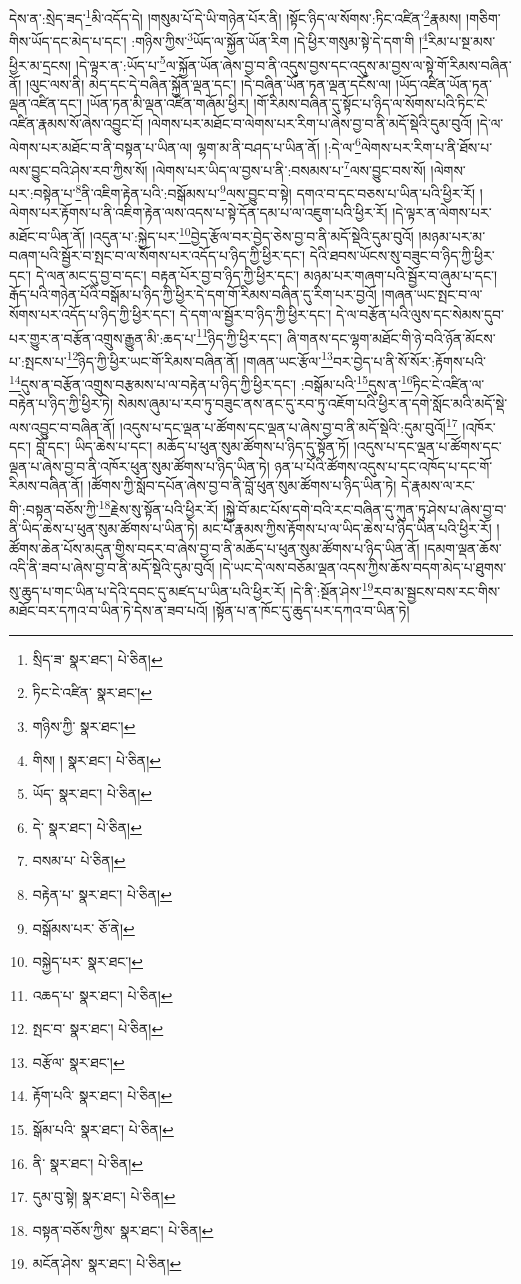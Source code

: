 དེས་ན་:སྲེད་ཟད་\footnote{སྲིད་ཟ་  སྣར་ཐང་།  པེ་ཅིན། }མི་འདོད་དེ། །གསུམ་པོ་དེ་ཡི་གཉེན་པོར་ནི། །སྟོང་ཉིད་ལ་སོགས་:ཏིང་འཛིན་\footnote{ཏིང་ངེ་འཛིན་  སྣར་ཐང་། }རྣམས། །གཅིག་གིས་ཡོད་དང་མེད་པ་དང་། :གཉིས་ཀྱིས་\footnote{གཉིས་ཀྱི་  སྣར་ཐང་། }ཡོད་ལ་སྐྱོན་ཡོན་རིག །དེ་ཕྱིར་གསུམ་སྟེ་དེ་དག་གི །\footnote{གིས། །  སྣར་ཐང་།  པེ་ཅིན། }རིམ་པ་སྔ་མས་ཕྱིར་མ་དྲངས། །དེ་ལྟར་ན་:ཡོད་པ་\footnote{ཡོད་  སྣར་ཐང་།  པེ་ཅིན། }ལ་སྐྱོན་ཡོན་ཞེས་བྱ་བ་ནི་འདུས་བྱས་དང་འདུས་མ་བྱས་ལ་སྟེ་གོ་རིམས་བཞིན་ནོ། །ལུང་ལས་ནི། མེད་དང་དེ་བཞིན་སྐྱོན་ལྡན་དང་། །དེ་བཞིན་ཡོན་ཏན་ལྡན་དངོས་ལ། །ཡོད་འཛིན་ཡོན་ཏན་ལྡན་འཛིན་དང་། །ཡོན་ཏན་མི་ལྡན་འཛིན་གཞོམ་ཕྱིར། །གོ་རིམས་བཞིན་དུ་སྟོང་པ་ཉིད་ལ་སོགས་པའི་ཏིང་ངེ་འཛིན་རྣམས་སོ་ཞེས་འབྱུང་ངོ། །ལེགས་པར་མཐོང་བ་ལེགས་པར་རིག་པ་ཞེས་བྱ་བ་ནི་མདོ་སྡེའི་དུམ་བུའོ། །དེ་ལ་ལེགས་པར་མཐོང་བ་ནི་བསྟན་པ་ཡིན་ལ། ལྷག་མ་ནི་བཤད་པ་ཡིན་ནོ། །:དེ་ལ་\footnote{དེ་  སྣར་ཐང་།  པེ་ཅིན། }ལེགས་པར་རིག་པ་ནི་ཐོས་པ་ལས་བྱུང་བའི་ཤེས་རབ་ཀྱིས་སོ། །ལེགས་པར་ཡིད་ལ་བྱས་པ་ནི་:བསམས་པ་\footnote{བསམ་པ་  པེ་ཅིན། }ལས་བྱུང་བས་སོ། །ལེགས་པར་:བསྟེན་པ་\footnote{བརྟེན་པ་  སྣར་ཐང་།  པེ་ཅིན། }ནི་འཇིག་རྟེན་པའི་:བསྒོམས་པ་\footnote{བསྒོམས་པར་  ཅོ་ནེ། }ལས་བྱུང་བ་སྟེ། དགའ་བ་དང་བཅས་པ་ཡིན་པའི་ཕྱིར་རོ། །ལེགས་པར་རྟོགས་པ་ནི་འཇིག་རྟེན་ལས་འདས་པ་སྟེ་དོན་དམ་པ་ལ་འཇུག་པའི་ཕྱིར་རོ། །དེ་ལྟར་ན་ལེགས་པར་མཐོང་བ་ཡིན་ནོ། །འདུན་པ་:སྐྱེད་པར་\footnote{བསྐྱེད་པར་  སྣར་ཐང་། }བྱེད་རྩོལ་བར་བྱེད་ཅེས་བྱ་བ་ནི་མདོ་སྡེའི་དུམ་བུའོ། །མཉམ་པར་མ་བཞག་པའི་སྦྱོར་བ་སྤང་བ་ལ་སོགས་པར་འདོད་པ་ཉིད་ཀྱི་ཕྱིར་དང་། དེའི་ཐབས་ཡོངས་སུ་བཟུང་བ་ཉིད་ཀྱི་ཕྱིར་དང་། དེ་ལན་མང་དུ་བྱ་བ་དང་། བརྟན་པོར་བྱ་བ་ཉིད་ཀྱི་ཕྱིར་དང་། མཉམ་པར་གཞག་པའི་སྦྱོར་བ་ཞུམ་པ་དང་། རྒོད་པའི་གཉེན་པོའི་བསྒོམ་པ་ཉིད་ཀྱི་ཕྱིར་དེ་དག་གོ་རིམས་བཞིན་དུ་རིག་པར་བྱའོ། །གཞན་ཡང་སྤང་བ་ལ་སོགས་པར་འདོད་པ་ཉིད་ཀྱི་ཕྱིར་དང་། དེ་དག་ལ་སྦྱོར་བ་ཉིད་ཀྱི་ཕྱིར་དང་། དེ་ལ་བརྩོན་པའི་ལུས་དང་སེམས་དུབ་པར་གྱུར་ན་བརྩོན་འགྲུས་རྒྱུན་མི་:ཆད་པ་\footnote{འཆད་པ་  སྣར་ཐང་།  པེ་ཅིན། }ཉིད་ཀྱི་ཕྱིར་དང་། ཞི་གནས་དང་ལྷག་མཐོང་གི་ཉེ་བའི་ཉོན་མོངས་པ་:སྤངས་པ་\footnote{སྤང་བ་  སྣར་ཐང་།  པེ་ཅིན། }ཉིད་ཀྱི་ཕྱིར་ཡང་གོ་རིམས་བཞིན་ནོ། །གཞན་ཡང་རྩོལ་\footnote{བརྩོལ་  སྣར་ཐང་། }བར་བྱེད་པ་ནི་སོ་སོར་:རྟོགས་པའི་\footnote{རྟོག་པའི་  སྣར་ཐང་།  པེ་ཅིན། }དུས་ན་བརྩོན་འགྲུས་བརྩམས་པ་ལ་བརྟེན་པ་ཉིད་ཀྱི་ཕྱིར་དང་། :བསྒོམ་པའི་\footnote{སྒོམ་པའི་  སྣར་ཐང་།  པེ་ཅིན། }དུས་ན་\footnote{ནི་  སྣར་ཐང་།  པེ་ཅིན། }ཏིང་ངེ་འཛིན་ལ་བརྟེན་པ་ཉིད་ཀྱི་ཕྱིར་ཏེ། སེམས་ཞུམ་པ་རབ་ཏུ་བཟུང་ནས་ནང་དུ་རབ་ཏུ་འཇོག་པའི་ཕྱིར་ན་དགེ་སློང་མའི་མདོ་སྡེ་ལས་འབྱུང་བ་བཞིན་ནོ། །འདུས་པ་དང་ལྡན་པ་ཚོགས་དང་ལྡན་པ་ཞེས་བྱ་བ་ནི་མདོ་སྡེའི་:དུམ་བུའོ།\footnote{དུམ་བུ་སྟེ།  སྣར་ཐང་།  པེ་ཅིན། } །འཁོར་དང་། བློ་དང་། ཡིད་ཆེས་པ་དང་། མཆོད་པ་ཕུན་སུམ་ཚོགས་པ་ཉིད་དུ་སྟོན་ཏོ། །འདུས་པ་དང་ལྡན་པ་ཚོགས་དང་ལྡན་པ་ཞེས་བྱ་བ་ནི་འཁོར་ཕུན་སུམ་ཚོགས་པ་ཉིད་ཡིན་ཏེ། ཉན་པ་པོའི་ཚོགས་འདུས་པ་དང་འཁོད་པ་དང་གོ་རིམས་བཞིན་ནོ། །ཚོགས་ཀྱི་སློབ་དཔོན་ཞེས་བྱ་བ་ནི་བློ་ཕུན་སུམ་ཚོགས་པ་ཉིད་ཡིན་ཏེ། དེ་རྣམས་ལ་རང་གི་:བསྟན་བཅོས་ཀྱི་\footnote{བསྟན་བཅོས་ཀྱིས་  སྣར་ཐང་།  པེ་ཅིན། }རྗེས་སུ་སྟོན་པའི་ཕྱིར་རོ། །སྐྱེ་བོ་མང་པོས་དགེ་བའི་རང་བཞིན་དུ་ཀུན་ཏུ་ཤེས་པ་ཞེས་བྱ་བ་ནི་ཡིད་ཆེས་པ་ཕུན་སུམ་ཚོགས་པ་ཡིན་ཏེ། མང་པོ་རྣམས་ཀྱིས་རྟོགས་པ་ལ་ཡིད་ཆེས་པ་ཉིད་ཡིན་པའི་ཕྱིར་རོ། །ཚོགས་ཆེན་པོས་མདུན་གྱིས་བདར་བ་ཞེས་བྱ་བ་ནི་མཆོད་པ་ཕུན་སུམ་ཚོགས་པ་ཉིད་ཡིན་ནོ། །དམག་ལྡན་ཆོས་འདི་ནི་ཟབ་པ་ཞེས་བྱ་བ་ནི་མདོ་སྡེའི་དུམ་བུའོ། །དེ་ཡང་དེ་ལས་བཅོམ་ལྡན་འདས་ཀྱིས་ཆོས་བདག་མེད་པ་ཐུགས་སུ་ཆུད་པ་གང་ཡིན་པ་དེའི་དབང་དུ་མཛད་པ་ཡིན་པའི་ཕྱིར་རོ། །དེ་ནི་:སྔོན་ཤེས་\footnote{མངོན་ཤེས་  སྣར་ཐང་།  པེ་ཅིན། }རབ་མ་སྦྱངས་བས་རང་གིས་མཐོང་བར་དཀའ་བ་ཡིན་ཏེ་དེས་ན་ཟབ་པའོ། །སྟོན་པ་ན་ཁོང་དུ་ཆུད་པར་དཀའ་བ་ཡིན་ཏེ། 